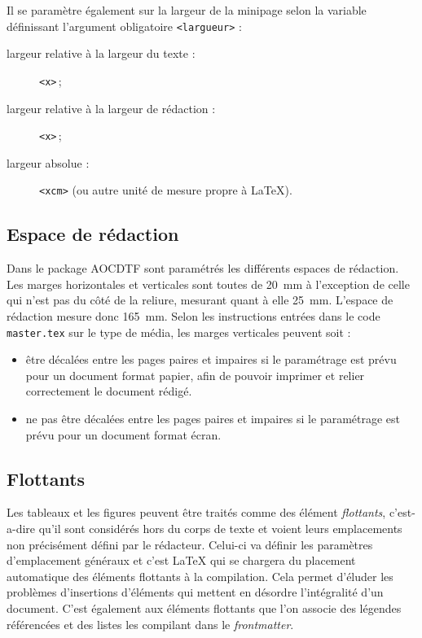 \documentclass[a4paper, 11pt, twoside, fleqn]{memoir}
\begin{document}
Il se paramètre également sur la largeur de la minipage selon la variable définissant l'argument obligatoire \texttt{{<largueur>}} :
\begin{description}
\item[largeur relative à la largeur du texte :] \texttt{<x\linewidth>}\,;
\item[largeur relative à la largeur de rédaction :] \texttt{<x\textwidth>}\,;
\item[largeur absolue :] \texttt{<xcm>} (ou autre unité de mesure propre à \LaTeX{}).
\end{description}

			\subsection{Espace de rédaction}

Dans le package AOCDTF sont paramétrés les différents espaces de rédaction. Les marges horizontales et verticales sont toutes de \SI{20}{\milli\meter} à l'exception de celle qui n'est pas du côté de la reliure, mesurant quant à elle \SI{25}{\milli\meter}. L'espace de rédaction mesure donc \SI{165}{\milli\meter}. Selon les instructions entrées dans le code \texttt{master.tex} sur le type de média, les marges verticales peuvent soit :
\begin{itemize}
\item être décalées entre les pages paires et impaires si le paramétrage est prévu pour un document format papier, afin de pouvoir imprimer et relier correctement le document rédigé.
\item ne pas être décalées entre les pages paires et impaires si le paramétrage est prévu pour un document format écran.
\end{itemize}

			\subsection{Flottants\label{subsec:flottants}}

Les tableaux et les figures peuvent être traités comme des élément \emph{flottants}, c'est-a-dire qu'il sont considérés hors du corps de texte et voient leurs emplacements non précisément défini par le rédacteur. Celui-ci va définir les paramètres d'emplacement généraux et c'est \LaTeX{} qui se chargera du placement automatique des éléments flottants à la compilation. Cela permet d'éluder les problèmes d'insertions d'éléments qui mettent en désordre l'intégralité d'un document.
C'est également aux éléments flottants que l'on associe des légendes référencées et des listes les compilant dans le \emph{frontmatter}.\\
\end{document}
